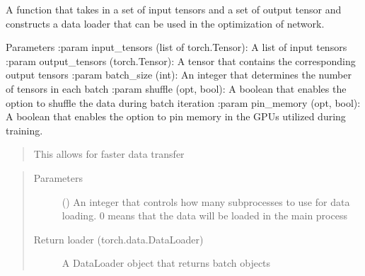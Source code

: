\documentclass[letterpaper,10pt,english]{sphinxmanual}
\begin{document}
\begin{fulllineitems}
\label{\detokenize{modules/gqcml.datasets:gqcml.datasets.Datasets.DataLoader_constructor}}
A function that takes in a set of input tensors and a set of output tensor and
constructs a data loader that can be used in the optimization of network.

Parameters
:param input\_tensors (list of torch.Tensor): A list of input tensors
:param output\_tensors (torch.Tensor): A tensor that contains the corresponding output tensors
:param batch\_size (int): An integer that determines the number of tensors in each batch
:param shuffle (opt, bool): A boolean that enables the option to shuffle the data during batch iteration
:param pin\_memory (opt, bool): A boolean that enables the option to pin memory in the GPUs utilized during training.
\begin{quote}

This allows for faster data transfer
\end{quote}
\begin{quote}\begin{description}
\item[{Parameters}] \leavevmode
\sphinxstyleliteralstrong{\sphinxupquote{(}}\sphinxstyleliteralstrong{\sphinxupquote{, }}\sphinxstyleliteralstrong{\sphinxupquote{)}} () \textendash{} An integer that controls how many subprocesses to use for data loading.
0 means that the data will be loaded in the main process

\item[{Return loader (torch.data.DataLoader)}] \leavevmode
A DataLoader object that returns batch objects

\end{description}\end{quote}

\end{fulllineitems}

\end{document}
